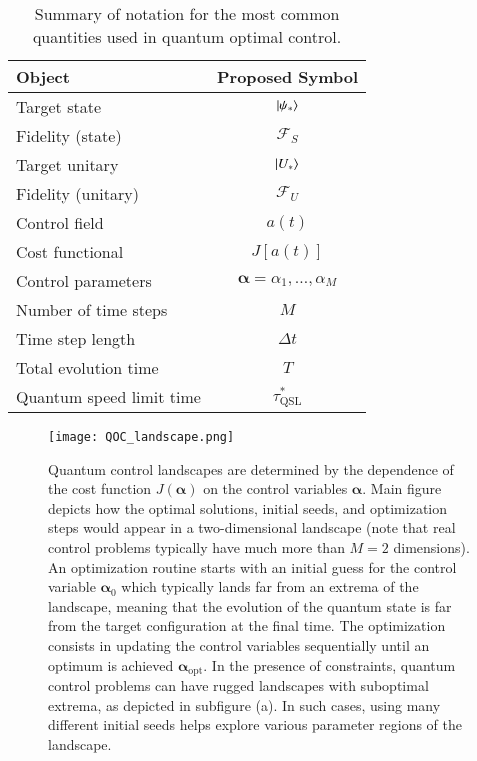 \begin{table}[b]
\centering
\begin{tabular}{|p{12.5cm}|c|}
\hline
Object & Proposed Symbol \\
\hline\hline
Target state & $\ket{\psi_\ast}$ \\
\hline
Fidelity (state) & $\mathcal{F}_S$ \\
\hline
Target unitary & $\ket{U_\ast}$ \\
\hline
Fidelity (unitary) & $\mathcal{F}_U$ \\
\hline
Control field & $a(t)$ \\
\hline
Cost functional & $J[a(t)]$ \\
\hline
Control parameters & $\bm{\alpha}={\alpha_1,\ldots,\alpha_M}$  \\
\hline
Number of time steps & $M$\\
\hline 
Time step length & $\Delta t$ \\
\hline
Total evolution time & $T$ \\
\hline
Quantum speed limit time & $\tau_{\mathrm{QSL}}^\ast$ \\
\hline
\end{tabular}
\caption{Summary of notation for the most common quantities used in quantum optimal control.}
\label{table:QOCSymbols}
\end{table}

\begin{figure}[t]
\centering
\texttt{[image: QOC\_landscape.png]}
\caption{Quantum control landscapes are determined by the dependence of the cost function $J(\bm{\alpha})$ on the control variables $\bm{\alpha}$. Main figure depicts how the optimal solutions, initial seeds, and optimization steps would appear in a two-dimensional landscape (note that real control problems typically have much more than $M=2$ dimensions). An optimization routine starts with an initial guess for the control variable $\bm{\alpha}_0$ which typically lands far from an extrema of the landscape, meaning that the evolution of the quantum state is far from the target configuration at the final time. The optimization consists in updating the control variables sequentially until an optimum is achieved $\bm{\alpha}_{\text{opt}}$. In the presence of constraints, quantum control problems can have rugged landscapes with suboptimal extrema, as depicted in subfigure (a). In such cases, using many different initial seeds helps explore various parameter regions of the landscape.}
\label{fig:QOC_landscapes}
\end{figure}


